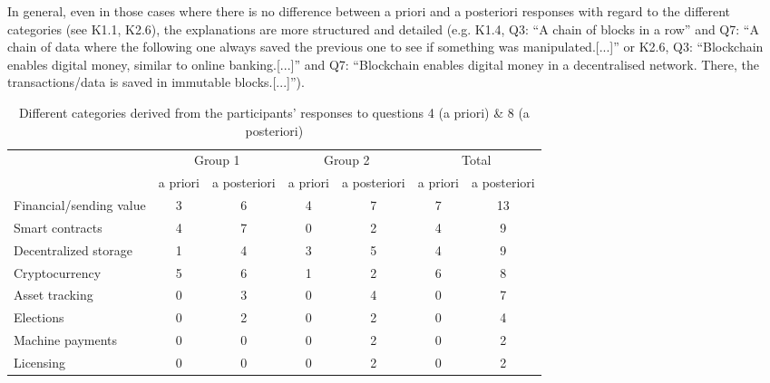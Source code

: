 In general, even in those cases where there is no difference between a priori and a posteriori responses with regard to the different categories (see K1.1, K2.6), the explanations are more structured and detailed (e.g. K1.4, Q3: \enquote{A chain of blocks in a row} and Q7: \enquote{A chain of data where the following one always saved the previous one to see if something was manipulated.[...]} or K2.6, Q3: \enquote{Blockchain enables digital money, similar to online banking.[...]} and Q7: \enquote{Blockchain enables digital money in a decentralised network. There, the transactions/data is saved in immutable blocks.[...]}).

\setlength\dashlinedash{0.2pt}
\setlength\dashlinegap{1.5pt}
\setlength\arrayrulewidth{0.3pt}

\begin{table}[]
    \centering
    \begin{tabular}{l|cc|cc|cc}
          & \multicolumn{2}{c}{Group 1} & \multicolumn{2}{c}{Group 2} & \multicolumn{2}{c}{Total} \\
          & a priori   & a posteriori  & a priori   & a posteriori   & a priori  & a posteriori  \\
        \hline
Financial/sending value &   3         &        6       &     4       &      7          &    7       &       13      \\
Smart contracts          &   4         &        7       &     0       &        2        &     4      &       9      \\
Decentralized storage   &     1       &        4       &      3      &         5       &     4      &      9        \\
Cryptocurrency          &   5         &       6        &      1      &       2         &     6      &      8        \\
\hdashline
Asset tracking          &     0       &       3        &     0       &       4         &     0      &       7       \\
Elections               &     0       &       2        &     0       &       2         &     0      &      4        \\
Machine payments        &     0       &       0        &     0       &       2         &     0      &      2        \\
Licensing               &     0       &       0        &     0       &       2         &     0      &       2       \\
\end{tabular}
    \caption{Different categories derived from the participants' responses to questions 4 (a priori) \& 8 (a posteriori)}
    \label{tab:results48}
\end{table}


